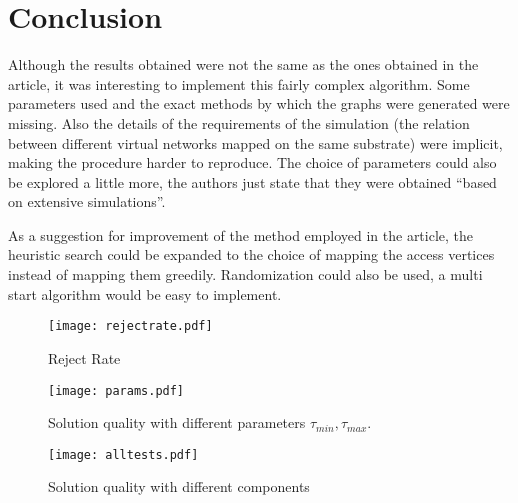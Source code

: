 \documentclass[10pt, a4paper, twocolumn]{article}
\begin{document}
\section{Conclusion}
Although the results obtained were not the same as the ones obtained in the article, it was interesting to implement this fairly complex algorithm. Some parameters used and the exact methods by which the graphs were generated were missing. Also the details of the requirements of the simulation (the relation between different virtual networks mapped on the same substrate) were implicit, making the procedure harder to reproduce. The choice of parameters could also be explored a little more, the authors just state that they were obtained ``based on extensive simulations''.

As a suggestion for improvement of the method employed in the article, the heuristic search could be expanded to the choice of mapping the access vertices instead of mapping them greedily. Randomization could also be used, a multi start algorithm would be easy to implement.




\onecolumn
\begin{figure}[h]
  \centering
  \texttt{[image: rejectrate.pdf]}
  \caption{Reject Rate}\label{reject}
\end{figure}


\begin{figure}[h]
  \centering
  \texttt{[image: params.pdf]}
  \caption{Solution quality with different parameters $\tau_{min},\tau_{max}$.}\label{fig:param}
\end{figure}

\begin{figure}[h]
  \centering
  \texttt{[image: alltests.pdf]}
  \caption{Solution quality with different components}\label{fig:all}
\end{figure}
\end{document}
